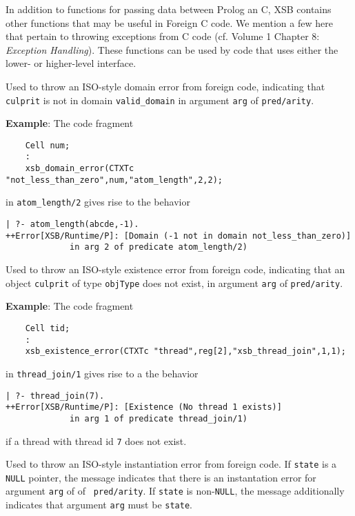 In addition to functions for passing data between Prolog an C, XSB
contains other functions that may be useful in Foreign C code.  We
mention a few here that pertain to throwing exceptions from C code
(cf. Volume 1 Chapter 8: {\em Exception Handling}).  These functions
can be used by code that uses either the lower- or higher-level
interface.

\begin{description}
%
Used to throw an ISO-style domain error from foreign code, indicating
that {\tt culprit} is not in domain {\tt valid\_domain} in argument
{\tt arg} of {\tt pred/arity}.

{\bf Example}: The code fragment
%
\begin{verbatim}
    Cell num;
    : 
    xsb_domain_error(CTXTc "not_less_than_zero",num,"atom_length",2,2);
\end{verbatim}
in {\tt atom\_length/2} gives rise to the behavior
%
\begin{verbatim}
| ?- atom_length(abcde,-1).
++Error[XSB/Runtime/P]: [Domain (-1 not in domain not_less_than_zero)] 
             in arg 2 of predicate atom_length/2)
\end{verbatim}


%
Used to throw an ISO-style existence error from foreign code,
indicating that an object {\tt culprit} of type {\tt objType} does not
exist, in argument {\tt arg} of {\tt pred/arity}.

{\bf Example}: The code fragment
%
\begin{verbatim}
    Cell tid;
    :
    xsb_existence_error(CTXTc "thread",reg[2],"xsb_thread_join",1,1); 
\end{verbatim}
in {\tt thread\_join/1} gives rise to a the behavior
\begin{verbatim}
| ?- thread_join(7).
++Error[XSB/Runtime/P]: [Existence (No thread 1 exists)] 
             in arg 1 of predicate thread_join/1)
\end{verbatim}
if a thread with thread id {\tt 7} does not exist.


  
%
Used to throw an ISO-style instantiation error from foreign code.  If
{\tt state} is a {\tt NULL} pointer, the message indicates that there
is an instantation error for argument {\tt arg} of of {\tt
  pred/arity}.  If {\tt state} is non-{\tt NULL}, the message
additionally indicates that argument {\tt arg} must be {\tt state}.


\end{description}
